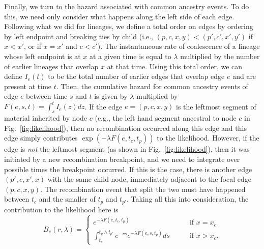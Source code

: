 \documentclass{article}
\begin{document}
Finally, we turn to the hazard associated with common ancestry events.
To do this,
we need only consider what happens along the left side of each edge.
Following what we did for lineages, we define a total order on edges
by ordering by left endpoint and breaking ties by child
(i.e., $(p,c,x,y) < (p',c',x',y')$
if $x<x'$, or if $x=x'$ and $c<c'$).
The instantaneous rate of coalescence of a lineage whose left endpoint is at $x$
at a given time is equal to $\lambda$ multiplied
by the number of earlier lineages that overlap $x$ at that time.
Using this total order, we can define
$I_e(t)$ to be the total number of earlier edges that overlap edge $e$
and are present at time $t$.
Then, the cumulative hazard for common ancestry events of edge $e$
between time $s$ and $t$ is given by $\lambda$ multiplied by
$F(e, s, t) = \int_{s}^{t} I_{e}(z) dz$. 
If the edge $e = (p,c,x,y)$
is the leftmost segment of material inherited by node $c$
(e.g., the left hand segment ancestral to node $c$
in Fig.~\ref{fig:likelihood}),
then no recombination occurred along this edge and
this edge simply contributes $\exp(-\lambda F(e,t_c,t_p))$ to the likelihood.
However, if the edge is \emph{not} the leftmost segment
(as shown in Fig.~\ref{fig:likelihood}),
then it was initiated by a new recombination breakpoint,
and we need to integrate over possible times the breakpoint occurred.
If this is the case, there is another edge $(p',c,x',x)$ with the same child node,
immediately adjacent to the focal edge $(p,c,x,y)$.
The recombination event that split the two must have happened between $t_c$
and the smaller of $t_p$ and $t_{p'}$.
Taking all this into consideration,
the contribution to the likelihood here is
\begin{equation}\label{eq:depth}
B_e(r, \lambda) = \begin{cases}
    e^{-\lambda F(e, t_c, t_p)}
        & \qquad \text{if } x=x_{c} \\
    \int_{t_c}^{t_{p} \wedge t_{p'}} e^{- r s} e^{-\lambda F(e, s, t_{p})} ds
        & \qquad \text{if } x>x_{c} .
\end{cases}
\end{equation}
\end{document}
